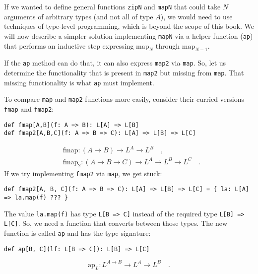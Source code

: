 If we wanted to define general functions \lstinline!zipN! and \lstinline!mapN!
that could take $N$ arguments of arbitrary types (and not all of
type $A$), we would need to use techniques of type-level programming,
which is beyond the scope of this book. We will now describe a simpler
solution implementing \lstinline!mapN! via a helper function (\lstinline!ap!)
that performs an inductive step expressing $\text{map}_{N}$ through
$\text{map}_{N-1}$.

If the \lstinline!ap! method can do that, it can also express \lstinline!map2!
via \lstinline!map!. So, let us determine the functionality that
is present in \lstinline!map2! but missing from \lstinline!map!.
That missing functionality is what \lstinline!ap! must implement.

To compare \lstinline!map! and \lstinline!map2! functions more easily,
consider their curried versions \lstinline!fmap! and \lstinline!fmap2!:
\begin{lstlisting}
def fmap[A,B](f: A => B): L[A] => L[B]
def fmap2[A,B,C](f: A => B => C): L[A] => L[B] => L[C]
\end{lstlisting}
\begin{align*}
 & \text{fmap}:\left(A\rightarrow B\right)\rightarrow L^{A}\rightarrow L^{B}\quad,\\
 & \text{fmap}_{2}:\left(A\rightarrow B\rightarrow C\right)\rightarrow L^{A}\rightarrow L^{B}\rightarrow L^{C}\quad.
\end{align*}
If we try implementing \lstinline!fmap2! via \lstinline!map!, we
get stuck:
\begin{lstlisting}
def fmap2[A, B, C](f: A => B => C): L[A] => L[B] => L[C] = { la: L[A] => la.map(f) ??? }
\end{lstlisting}
The value \lstinline!la.map(f)! has type \lstinline!L[B => C]! instead
of the required type \lstinline!L[B] => L[C]!. So, we need a function
that converts between those types. The new function is called \lstinline!ap!
and has the type signature:
\begin{lstlisting}
def ap[B, C](lf: L[B => C]): L[B] => L[C]
\end{lstlisting}
\[
\text{ap}_{L}:L^{A\rightarrow B}\rightarrow L^{A}\rightarrow L^{B}\quad.
\]

